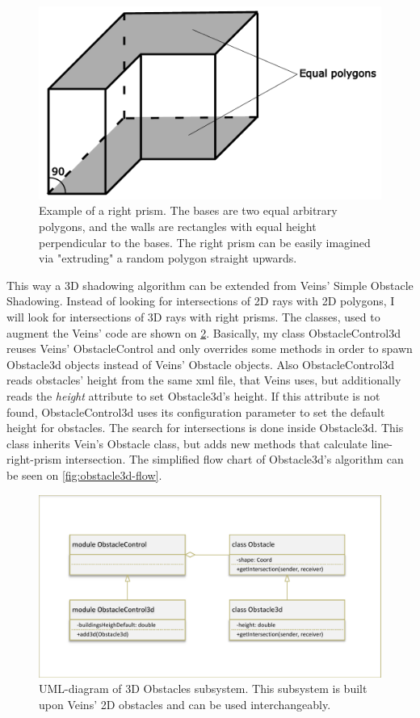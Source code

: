 \documentclass[]{nsm-thesis}
\begin{document}
\begin{figure}
	\centering
	\includegraphics[width=1\textwidth]{figures/RightPrism.pdf}
	\caption{Example of a right prism. The bases are two equal arbitrary polygons, and the walls are rectangles with equal height perpendicular to the bases. The right prism can be easily imagined via "extruding" a random polygon straight upwards.}
	\label{fig:rightprism}
\end{figure}

This way a 3D shadowing algorithm can be extended from Veins' Simple Obstacle Shadowing. Instead of looking for intersections of 2D rays with 2D polygons, I will look for intersections of 3D rays with right prisms. The classes, used to augment the Veins' code are shown on \cref{fig:obstacle3d-classes}.  Basically, my class ObstacleControl3d reuses Veins' ObstacleControl and only overrides some methods in order to spawn Obstacle3d objects instead of Veins' Obstacle objects. Also ObstacleControl3d reads obstacles' height from the same xml file, that Veins uses, but additionally reads the \emph{height} attribute to set Obstacle3d's height. If this attribute is not found, ObstacleControl3d uses its configuration parameter to set the default height for obstacles. The search for intersections is done inside Obstacle3d. This class inherits Vein's Obstacle class, but adds new methods that calculate line-right-prism intersection. The simplified flow chart of Obstacle3d's algorithm can be seen on \cref{fig:obstacle3d-flow}. 

\begin{figure}
	\centering
	\includegraphics[width=1\textwidth]{figures/Obstacle3d-classes.pdf}
	\caption{UML-diagram of 3D Obstacles subsystem. This subsystem is built upon Veins' 2D obstacles and can be used interchangeably.}
	\label{fig:obstacle3d-classes}
\end{figure}
\end{document}
